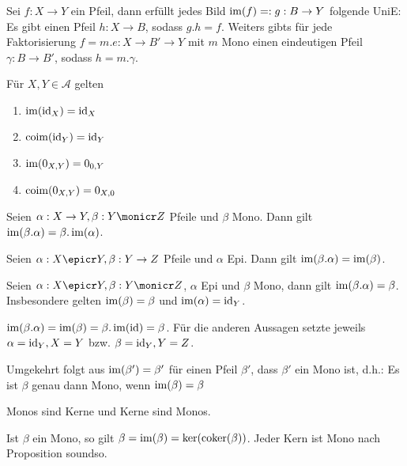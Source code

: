 \begin{prop}
Sei $f:X\to Y$ ein Pfeil, dann erfüllt jedes Bild $\operatorname{im}(f) =: g : B \to Y$ folgende UniE:
Es gibt einen Pfeil $h : X \to B$, sodass $g.h = f$. Weiters gibts für jede Faktorisierung $f = m . e : X \to B' \to Y$ mit $m$ Mono einen eindeutigen Pfeil $\gamma : B \to B'$, sodass $h = m.\gamma$.
\end{prop}

\begin{prop}
Für $X,Y \in \mathcal A$ gelten
\begin{enumerate}
\item $\operatorname{im}(\operatorname{id}_X) = \operatorname{id}_X$
\item $\operatorname{coim}(\operatorname{id}_Y) = \operatorname{id}_Y$
\item $\operatorname{im}(0_{X,Y}) = 0_{0,Y}$
\item $\operatorname{coim}(0_{X,Y}) = 0_{X,0}$
\end{enumerate}
\end{prop}


\begin{prop}
Seien $\alpha : X \to Y, \beta : Y \monicr Z$ Pfeile und $\beta$ Mono.
Dann gilt $\operatorname{im}(\beta.\alpha) = \beta.\operatorname{im}(\alpha)$.
\end{prop}


\begin{prop}
Seien $\alpha : X \epicr Y, \beta : Y \to Z$ Pfeile und $\alpha$ Epi.
Dann gilt $\operatorname{im}(\beta.\alpha) = \operatorname{im}(\beta)$.
\end{prop}

\begin{korr}
Seien $\alpha : X \epicr Y, \beta : Y \monicr Z$, $\alpha$ Epi und $\beta$ Mono, dann gilt $\operatorname{im}(\beta.\alpha) = \beta$. Insbesondere gelten $\operatorname{im}(\beta) = \beta$ und $\operatorname{im}(\alpha) = \operatorname{id}_Y$.
\end{korr}
\begin{bew}
$\operatorname{im}(\beta.\alpha) = \operatorname{im}(\beta) = \beta.\operatorname{im}(\operatorname{id}) = \beta$. Für die anderen Aussagen setzte jeweils $\alpha = \operatorname{id}_Y, X=Y$ bzw. $\beta = \operatorname{id}_Y, Y=Z$.
\end{bew}
\begin{bem}
Umgekehrt folgt aus $\operatorname{im}(\beta') = \beta'$ für einen Pfeil $\beta'$, dass $\beta'$ ein Mono ist, d.h.:
Es ist $\beta$ genau dann Mono, wenn $\operatorname{im}(\beta) = \beta$
\end{bem}

\begin{korr}
Monos sind Kerne und Kerne sind Monos.
\end{korr}
\begin{bew}
Ist $\beta$ ein Mono, so gilt $\beta = \operatorname{im}(\beta) = \ker(\operatorname{coker}(\beta))$.
Jeder Kern ist Mono nach Proposition soundso.
\end{bew}

